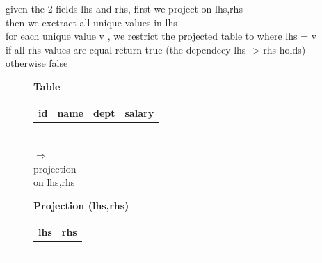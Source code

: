 \documentclass[11pt]{article}
\begin{document}
    given the 2 fields lhs and rhs,
    first we project on lhs,rhs \\

    then we exctract all unique values in lhs\\ 

    for each unique value v , we restrict the projected table to where lhs = v \\

    if all rhs values are equal return true (the dependecy lhs -> rhs holds)\\

    otherwise false \\

\begin{figure}[h]
\centering

\begin{minipage}{0.3\textwidth}
    \centering
    \textbf{   Table}\\[0.5em]
    \begin{tabular}{|c|c|c|c|}
    \hline
    \textbf{id} & \textbf{name} & \textbf{dept} & \textbf{salary} \\
    \hline
     & & & \\
     & & & \\
     & & & \\
     & & & \\
    \hline
    \end{tabular}
    \end{minipage}
    \hfill
    \begin{minipage}{0.05\textwidth}
    \centering
    $\Rightarrow$\\
    \small projection\\
    on lhs,rhs
    \end{minipage}
    \hfill
    \begin{minipage}{0.25\textwidth}
    \centering
    \textbf{Projection (lhs,rhs)}\\[0.5em]
    \begin{tabular}{|c|c|}
    \hline
    \textbf{lhs} & \textbf{rhs} \\
    \hline
     & \\
     & \\
     & \\
     & \\
    \hline
    \end{tabular}
    \end{minipage}
    \hfill
    \begin{minipage}{0.05\textwidth}

\end{minipage}
\end{figure}
\end{document}
